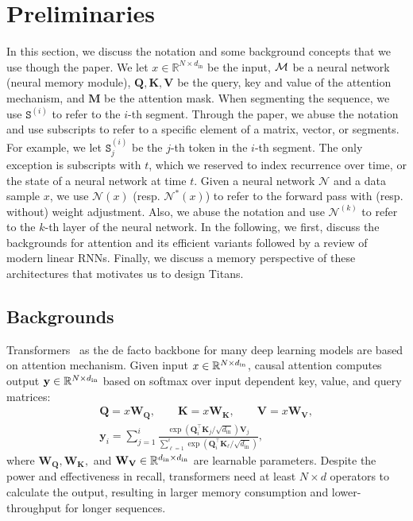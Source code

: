 \section{Preliminaries}\label{sec:prelim}
\lettrine[lines=3]{I}{}n this section, we discuss the notation and some background concepts that we use though the paper. We let $x \in \mathbb{R}^{N \times d_{\text{in}}}$ be the input, $\mathcal{M}$ be a neural network (neural memory module), $\mathbf{Q}, \mathbf{K}, \mathbf{V}$ be the query, key and value of the attention mechanism, and $\mathbf{M}$ be the attention mask. When segmenting the sequence, we use $\texttt{S}^{(i)}$ to refer to the $i$-th segment. Through the paper, we abuse the notation and use subscripts to refer to a specific element of a matrix, vector, or segments. For example, we let $\texttt{S}^{(i)}_j$ be the $j$-th token in the $i$-th segment. The only exception is subscripts with $t$, which we reserved to index recurrence over time, or the state of a neural network at time $t$. Given a neural network $\mathcal{N}$ and a data sample $x$, we use $\mathcal{N}(x)$ (resp. $\mathcal{N}^*(x)$) to refer to the forward pass with (resp. without) weight adjustment. Also, we abuse the notation and use $\mathcal{N}^{(k)}$ to refer to the $k$-th layer of the neural network. In the following, we first, discuss the backgrounds for attention and its efficient variants followed by a review of modern linear RNNs. Finally, we discuss a memory perspective of these architectures that motivates us to design Titans. 

\subsection{Backgrounds}\label{sec:background}
Transformers~\citep{transformers} as the de facto backbone for many deep learning models are based on attention mechanism. Given input $x \in \mathbb{R}^{N \times d_{\text{in}}}$, causal attention computes output $\mathbf{y} \in \mathbb{R}^{N \times d_{\text{in}}}$ based on softmax over input dependent key, value, and query matrices:
\begin{align}
    \mathbf{Q} = x \mathbf{W}_{\mathbf{Q}}, \qquad \mathbf{K} = x \mathbf{W}_{\mathbf{K}}, \qquad \mathbf{V} = x \mathbf{W}_{\mathbf{V}}, \\
    \mathbf{y}_i = \sum_{j = 1}^{i} \frac{ \exp\left( \mathbf{Q}_i^{\top} \mathbf{K}_j/\sqrt{d_{\text{in}}}\right) \mathbf{V}_j }{\sum_{\ell = 1}^{i} \exp\left( \mathbf{Q}_i^{\top} \mathbf{K}_{\ell}/\sqrt{d_{\text{in}}}\right)},
\end{align}
where $\mathbf{W}_{\mathbf{Q}}, \mathbf{W}_{\mathbf{K}},$ and $\mathbf{W}_{\mathbf{V}} \in \mathbb{R}^{d_{\text{in}} \times d_{\text{in}}}$ are learnable parameters. Despite the power and effectiveness in recall, transformers need at least $N\times d$ operators to calculate the output, resulting in larger memory consumption and lower-throughput for longer sequences.  


